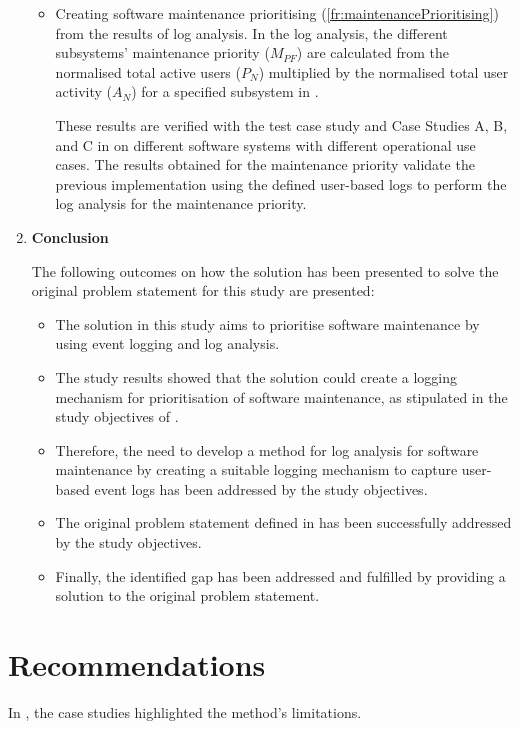 \begin{enumerate}[label=\textbf{\Roman*.}]
\begin{itemize}
		\item Creating software maintenance prioritising (\ref{fr:maintenancePrioritising}) from the results of log analysis. In the log analysis, the different subsystems' maintenance priority ($M_{PF}$) are calculated from the normalised total active users ($P_N$) multiplied by the normalised total user activity ($A_N$) for a specified subsystem in . \par These results are verified with the test case study and Case Studies A, B, and C in  on different software systems with different operational use cases. The results obtained for the maintenance priority validate the previous implementation using the defined user-based logs to perform the log analysis for the maintenance priority. 
	\end{itemize}

	\clearpage

\item \textbf{Conclusion} \par The following outcomes on how the solution has been presented to solve the original problem statement for this study are presented:
	\begin{itemize}
		\item The solution in this study aims to prioritise software maintenance by using event logging and log analysis.
		\item The study results showed that the solution could create a logging mechanism for prioritisation of software maintenance, as stipulated in the study objectives of .
		\item Therefore, the need to develop a method for log analysis for software maintenance by creating a suitable logging mechanism to capture user-based event logs has been addressed by the study objectives.
		\item The original problem statement defined in  has been successfully addressed by the study objectives.
		\item Finally, the identified gap has been addressed and fulfilled by providing a solution to the original problem statement.
	\end{itemize}
\end{enumerate}

\section{Recommendations}
In , the case studies highlighted the method's limitations. 

